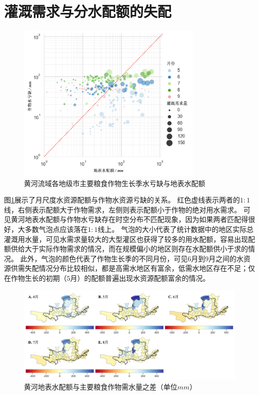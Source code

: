
\section{灌溉需求与分水配额的失配}

\begin{figure}[htb]
    \centering
    \includegraphics[width=0.8\textwidth]{img/ch6/ch6_matches.png}
    \caption{黄河流域各地级市主要粮食作物生长季水亏缺与地表水配额}\label{ch6:fig:matches}
\end{figure}

图\ref{ch6:fig:matches}展示了月尺度水资源配额与作物水资源亏缺的关系。
红色虚线表示两者的$1:1$线，右侧表示配额大于作物需求，左侧则表示配额小于作物的绝对用水需求。
可见黄河地表水配额与作物水亏缺存在时空分布不匹配现象，因为如果两者匹配得很好，大多数气泡点应该落在$1:1$线上。
气泡的大小代表了统计数据中的地区实际总灌溉用水量，可见水需求量较大的大型灌区也获得了较多的用水配额，容易出现配额供给大于实际作物需求的情况，而在规模偏小的地区则存在水配额供小于求的情况。
此外，气泡的颜色代表了作物生长季的不同月份，可见$6$月到$9$月之间的水资源供需失配情况分布比较相似，都是高需水地区有富余，低需水地区存在不足；仅在作物生长的初期（$5$月）的配额普遍出现水资源配额富余的情况。

\begin{figure}[htb]
    \centering
    \includegraphics[width=\textwidth]{img/ch6/ch6_deficits_map.png}
    \caption[黄河地表水配额与主要粮食作物需水量之差]{黄河地表水配额与主要粮食作物需水量之差（单位$mm$）}\label{ch6:fig:deficits_maps}
\end{figure}

